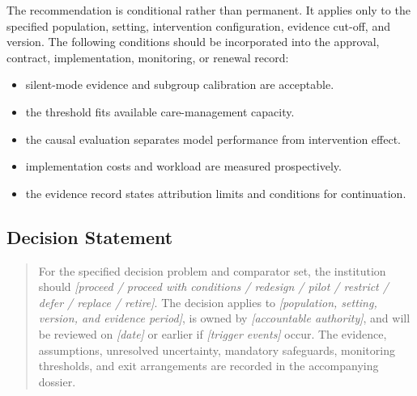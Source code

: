 The recommendation is conditional rather than permanent. It applies only to the
specified population, setting, intervention configuration, evidence cut-off, and
version. The following conditions should be incorporated into the approval,
contract, implementation, monitoring, or renewal record:

\begin{itemize}
 \item silent-mode evidence and subgroup calibration are acceptable.
 \item the threshold fits available care-management capacity.
 \item the causal evaluation separates model performance from intervention effect.
 \item implementation costs and workload are measured prospectively.
 \item the evidence record states attribution limits and conditions for continuation.
\end{itemize}

\subsection{Decision Statement}
\begin{quote}
For the specified decision problem and comparator set, the institution should
\emph{[proceed / proceed with conditions / redesign / pilot / restrict / defer /
replace / retire]}. The decision applies to \emph{[population, setting, version,
and evidence period]}, is owned by \emph{[accountable authority]}, and will be
reviewed on \emph{[date]} or earlier if \emph{[trigger events]} occur. The
evidence, assumptions, unresolved uncertainty, mandatory safeguards, monitoring
thresholds, and exit arrangements are recorded in the accompanying dossier.
\end{quote}
